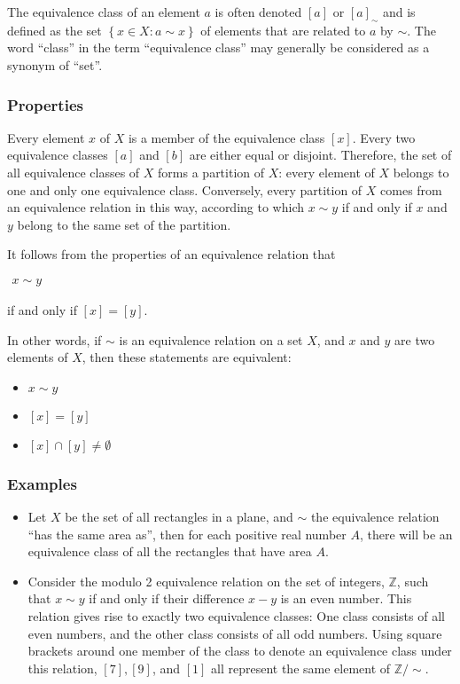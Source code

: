\begin{multicols}{2}
The equivalence class of an element $a$ is often denoted $\left[ a \right]$ or $\left[ a \right]_{\sim}$ and is defined as the set $\left\{ x \in X : a \sim x \right\}$ of elements that are related to $a$ by $\sim$. The word ``class'' in the term ``equivalence class'' may generally be considered as a synonym of ``set''.

\subsubsection{Properties}

Every element $x$ of $X$ is a member of the equivalence class $\left[ x \right]$. Every two equivalence classes $\left[ a \right]$ and $\left[ b \right]$ are either equal or disjoint. Therefore, the set of all equivalence classes of $X$ forms a partition of $X$: every element of $X$ belongs to one and only one equivalence class. Conversely, every partition of $X$ comes from an equivalence relation in this way, according to which $x \sim y$ if and only if $x$ and $y$ belong to the same set of the partition.

\noindent It follows from the properties of an equivalence relation that

$\begin{aligned}
    x \sim y
\end{aligned}$

\noindent if and only if $\left[ x \right] = \left[ y \right]$.

In other words, if $\sim$ is an equivalence relation on a set $X$, and $x$ and $y$ are two elements of $X$, then these statements are equivalent:
\begin{itemize}
    \item $x \sim y$
    \item $\left[ x \right] = \left[ y \right]$
    \item $\left[ x \right] \cap \left[ y \right] \neq \emptyset$
\end{itemize}

\subsubsection{Examples}

\begin{itemize}
    \item Let $X$ be the set of all rectangles in a plane, and $\sim$ the equivalence relation ``has the same area as'', then for each positive real number $A$, there will be an equivalence class of all the rectangles that have area $A$.
    \item Consider the modulo 2 equivalence relation on the set of integers, $\mathbb{Z}$, such that  $x \sim y$ if and only if their difference $x - y$ is an even number. This relation gives rise to exactly two equivalence classes: One class consists of all even numbers, and the other class consists of all odd numbers. Using square brackets around one member of the class to denote an equivalence class under this relation, $\left[ 7 \right], \left[ 9 \right]$, and $\left[ 1 \right]$ all represent the same element of $\mathbb{Z} / \sim$.
\end{itemize}
\end{multicols}